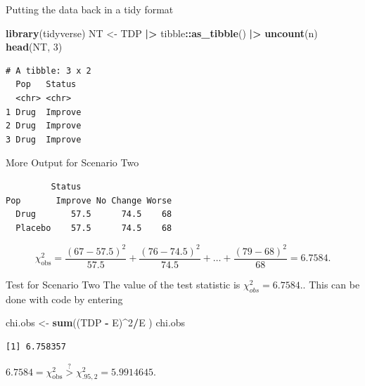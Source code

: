 \documentclass[
  ignorenonframetext,
]{beamer}
\newenvironment{Shaded}{\begin{snugshade}}{\end{snugshade}}
\newcommand{\DecValTok}[1]{\textcolor[rgb]{0.00,0.00,0.81}{#1}}
\newcommand{\FunctionTok}[1]{\textcolor[rgb]{0.13,0.29,0.53}{\textbf{#1}}}
\newcommand{\NormalTok}[1]{#1}
\newcommand{\OtherTok}[1]{\textcolor[rgb]{0.56,0.35,0.01}{#1}}
\newcommand{\SpecialCharTok}[1]{\textcolor[rgb]{0.81,0.36,0.00}{\textbf{#1}}}
\begin{document}
\begin{frame}[fragile]{Putting the data back in a tidy format}
\protect\hypertarget{putting-the-data-back-in-a-tidy-format}{}
\begin{Shaded}
\begin{Highlighting}[]
\FunctionTok{library}\NormalTok{(tidyverse)}
\NormalTok{NT }\OtherTok{\textless{}{-}}\NormalTok{ TDP }\SpecialCharTok{|\textgreater{}} 
\NormalTok{  tibble}\SpecialCharTok{::}\FunctionTok{as\_tibble}\NormalTok{() }\SpecialCharTok{|\textgreater{}} 
  \FunctionTok{uncount}\NormalTok{(n)}
\FunctionTok{head}\NormalTok{(NT, }\DecValTok{3}\NormalTok{)}
\end{Highlighting}
\end{Shaded}

\begin{verbatim}
# A tibble: 3 x 2
  Pop   Status 
  <chr> <chr>  
1 Drug  Improve
2 Drug  Improve
3 Drug  Improve
\end{verbatim}
\end{frame}

\begin{frame}[fragile]{More Output for Scenario Two}
\protect\hypertarget{more-output-for-scenario-two}{}
\begin{Shaded}
\end{Shaded}

\begin{verbatim}
         Status
Pop       Improve No Change Worse
  Drug       57.5      74.5    68
  Placebo    57.5      74.5    68
\end{verbatim}

\[\chi^2_{\text{obs}}=\frac{(67 - 57.5)^2}{57.5} + \frac{(76 - 74.5)^2}{74.5}+
\dots +\frac{(79-68)^2}{68}=6.7584.\]
\end{frame}

\begin{frame}[fragile]{Test for Scenario Two}
\protect\hypertarget{test-for-scenario-two-3}{}
The value of the test statistic is \(\chi^2_{obs}=6.7584.\). This can be
done with code by entering

\begin{Shaded}
\begin{Highlighting}[]
\NormalTok{chi.obs }\OtherTok{\textless{}{-}} \FunctionTok{sum}\NormalTok{((TDP }\SpecialCharTok{{-}}\NormalTok{ E)}\SpecialCharTok{\^{}}\DecValTok{2}\SpecialCharTok{/}\NormalTok{E )}
\NormalTok{chi.obs}
\end{Highlighting}
\end{Shaded}

\begin{verbatim}
[1] 6.758357
\end{verbatim}

\(6.7584 = \chi^2_{\text{obs}}\overset{?}{>} \chi^2_{.95,2}= 5.9914645.\)
\end{frame}
\end{document}
